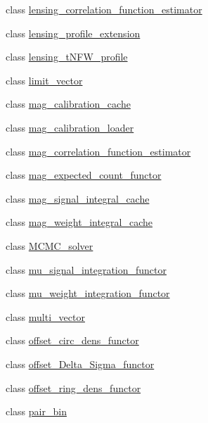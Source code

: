 \begin{DoxyCompactItemize}
\item 
class \hyperlink{classIceBRG_1_1lensing__correlation__function__estimator}{lensing\+\_\+correlation\+\_\+function\+\_\+estimator}
\item 
class \hyperlink{classIceBRG_1_1lensing__profile__extension}{lensing\+\_\+profile\+\_\+extension}
\item 
class \hyperlink{classIceBRG_1_1lensing__tNFW__profile}{lensing\+\_\+t\+N\+F\+W\+\_\+profile}
\item 
class \hyperlink{classIceBRG_1_1limit__vector}{limit\+\_\+vector}
\item 
class \hyperlink{classIceBRG_1_1mag__calibration__cache}{mag\+\_\+calibration\+\_\+cache}
\item 
class \hyperlink{classIceBRG_1_1mag__calibration__loader}{mag\+\_\+calibration\+\_\+loader}
\item 
class \hyperlink{classIceBRG_1_1mag__correlation__function__estimator}{mag\+\_\+correlation\+\_\+function\+\_\+estimator}
\item 
class \hyperlink{classIceBRG_1_1mag__expected__count__functor}{mag\+\_\+expected\+\_\+count\+\_\+functor}
\item 
class \hyperlink{classIceBRG_1_1mag__signal__integral__cache}{mag\+\_\+signal\+\_\+integral\+\_\+cache}
\item 
class \hyperlink{classIceBRG_1_1mag__weight__integral__cache}{mag\+\_\+weight\+\_\+integral\+\_\+cache}
\item 
class \hyperlink{classIceBRG_1_1MCMC__solver}{M\+C\+M\+C\+\_\+solver}
\item 
class \hyperlink{classIceBRG_1_1mu__signal__integration__functor}{mu\+\_\+signal\+\_\+integration\+\_\+functor}
\item 
class \hyperlink{classIceBRG_1_1mu__weight__integration__functor}{mu\+\_\+weight\+\_\+integration\+\_\+functor}
\item 
class \hyperlink{classIceBRG_1_1multi__vector}{multi\+\_\+vector}
\item 
class \hyperlink{classIceBRG_1_1offset__circ__dens__functor}{offset\+\_\+circ\+\_\+dens\+\_\+functor}
\item 
class \hyperlink{classIceBRG_1_1offset__Delta__Sigma__functor}{offset\+\_\+\+Delta\+\_\+\+Sigma\+\_\+functor}
\item 
class \hyperlink{classIceBRG_1_1offset__ring__dens__functor}{offset\+\_\+ring\+\_\+dens\+\_\+functor}
\item 
class \hyperlink{classIceBRG_1_1pair__bin}{pair\+\_\+bin}
\item 

\end{DoxyCompactItemize}
